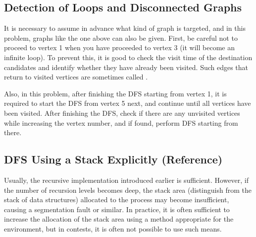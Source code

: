 \subsection*{Detection of Loops and Disconnected Graphs}
\begin{center}
\end{center}

It is necessary to assume in advance what kind of graph is targeted, and in this problem, graphs like the one above can also be given. First, be careful not to proceed to vertex 1 when you have proceeded to vertex 3 (it will become an infinite loop). To prevent this, it is good to check the visit time of the destination candidates and identify whether they have already been visited.
Such edges that return to visited vertices are sometimes called .

Also, in this problem, after finishing the DFS starting from vertex 1, it is required to start the DFS from vertex 5 next, and continue until all vertices have been visited. After finishing the DFS, check if there are any unvisited vertices while increasing the vertex number, and if found, perform DFS starting from there.

\subsection*{DFS Using a Stack Explicitly (Reference)}

Usually, the recursive implementation introduced earlier is sufficient. However, if the number of recursion levels becomes deep, the stack area (distinguish from the stack of data structures) allocated to the process may become insufficient, causing a segmentation fault or similar. In practice, it is often sufficient to increase the allocation of the stack area using a method appropriate for the environment, but in contests, it is often not possible to use such means.

